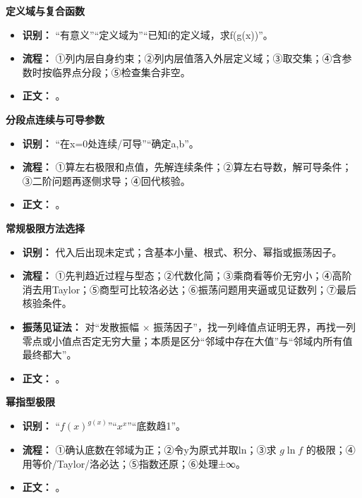 \begin{knowledgeBox}
\textbf{定义域与复合函数}

\begin{itemize}
  \item \textbf{识别：} “有意义”“定义域为”“已知f的定义域，求f(g(x))”。
  \item \textbf{流程：} ①列内层自身约束；②列内层值落入外层定义域；③取交集；④含参数时按临界点分段；⑤检查集合非空。
  \item \textbf{正文：} 。
\end{itemize}

\textbf{分段点连续与可导参数}

\begin{itemize}
  \item \textbf{识别：} “在x=0处连续/可导”“确定a,b”。
  \item \textbf{流程：} ①算左右极限和点值，先解连续条件；②算左右导数，解可导条件；③二阶问题再逐侧求导；④回代核验。
  \item \textbf{正文：} 。
\end{itemize}

\textbf{常规极限方法选择}

\begin{itemize}
  \item \textbf{识别：} 代入后出现未定式；含基本小量、根式、积分、幂指或振荡因子。
  \item \textbf{流程：} ①先判趋近过程与型态；②代数化简；③乘商看等价无穷小；④高阶消去用Taylor；⑤商型可比较洛必达；⑥振荡问题用夹逼或见证数列；⑦最后核验条件。
  \item \textbf{振荡见证法：} 对“发散振幅 \(\times\) 振荡因子”，找一列峰值点证明无界，再找一列零点或小值点否定无穷大量；本质是区分“邻域中存在大值”与“邻域内所有值最终都大”。
  \item \textbf{正文：} 。
\end{itemize}

\textbf{幂指型极限}

\begin{itemize}
  \item \textbf{识别：} “$f(x)^{g(x)}$”“$x^x$”“底数趋1”。
  \item \textbf{流程：} ①确认底数在邻域为正；②令y为原式并取ln；③求 $g\ln f$ 的极限；④用等价/Taylor/洛必达；⑤指数还原；⑥处理±∞。
  \item \textbf{正文：} 。
\end{itemize}


\end{knowledgeBox}
